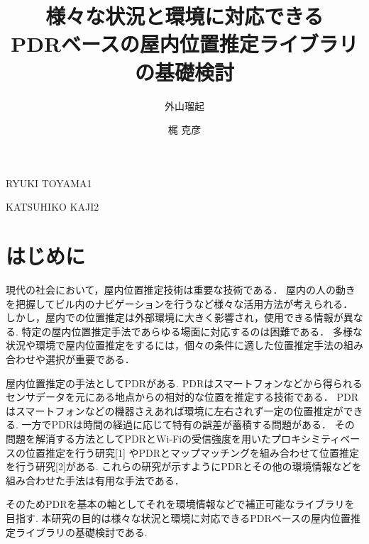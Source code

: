 \documentclass[Japanese]{abstruct}
\begin{document}
\title{様々な状況と環境に対応できる\\PDRベースの屋内位置推定ライブラリの基礎検討}





\author{外山瑠起}{RYUKI TOYAMA}{1}
\author{梶 克彦}{KATSUHIKO KAJI}{2}

\maketitle

\section{はじめに}

現代の社会において，屋内位置推定技術は重要な技術である．
屋内の人の動きを把握してビル内のナビゲーションを行うなど様々な活用方法が考えられる．
しかし，屋内での位置推定は外部環境に大きく影響され，使用できる情報が異なる.
特定の屋内位置推定手法であらゆる場面に対応するのは困難である．
多様な状況や環境で屋内位置推定をするには，個々の条件に適した位置推定手法の組み合わせや選択が重要である．

屋内位置推定の手法としてPDRがある.
PDRはスマートフォンなどから得られるセンサデータを元にある地点からの相対的な位置を推定する技術である．
PDRはスマートフォンなどの機器さえあれば環境に左右されず一定の位置推定ができる.
一方でPDRは時間の経過に応じて特有の誤差が蓄積する問題がある．
その問題を解消する方法としてPDRとWi-Fiの受信強度を用いたプロキシミティベースの位置推定を行う研究[1]
やPDRとマップマッチングを組み合わせて位置推定を行う研究[2]がある.
これらの研究が示すようにPDRとその他の環境情報などを組み合わせた手法は有用な手法である．

そのためPDRを基本の軸としてそれを環境情報などで補正可能なライブラリを目指す.
本研究の目的は様々な状況と環境に対応できるPDRベースの屋内位置推定ライブラリの基礎検討である.
\end{document}

